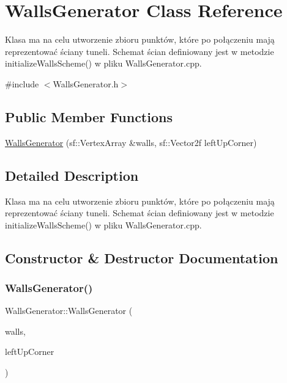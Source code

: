 \hypertarget{classWallsGenerator}{}\section{Walls\+Generator Class Reference}
\label{classWallsGenerator}


Klasa ma na celu utworzenie zbioru punktów, które po połączeniu mają reprezentować ściany tuneli. Schemat ścian definiowany jest w metodzie initialize\+Walls\+Scheme() w pliku Walls\+Generator.\+cpp.  




{\ttfamily \#include $<$Walls\+Generator.\+h$>$}

\subsection*{Public Member Functions}
\begin{DoxyCompactItemize}
\item 
\hyperlink{classWallsGenerator_ae1cfcd3b678f1de130b146dfcee08d68}{Walls\+Generator} (sf\+::\+Vertex\+Array \&walls, sf\+::\+Vector2f left\+Up\+Corner)
\end{DoxyCompactItemize}


\subsection{Detailed Description}
Klasa ma na celu utworzenie zbioru punktów, które po połączeniu mają reprezentować ściany tuneli. Schemat ścian definiowany jest w metodzie initialize\+Walls\+Scheme() w pliku Walls\+Generator.\+cpp. 

\subsection{Constructor \& Destructor Documentation}
\mbox{\label{classWallsGenerator_ae1cfcd3b678f1de130b146dfcee08d68}} 
\subsubsection{\texorpdfstring{Walls\+Generator()}{WallsGenerator()}}
{\footnotesize\ttfamily Walls\+Generator\+::\+Walls\+Generator (\begin{DoxyParamCaption}\item[{sf\+::\+Vertex\+Array \&}]{walls,  }\item[{sf\+::\+Vector2f}]{left\+Up\+Corner }\end{DoxyParamCaption})}

